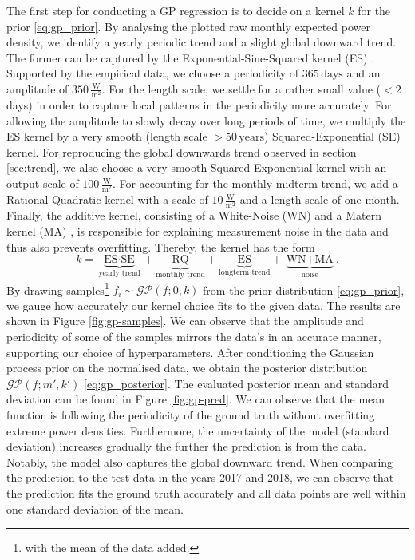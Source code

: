 \documentclass{article}
\theoremstyle{plain}
\theoremstyle{definition}
\theoremstyle{remark}
\begin{document}
The first step for conducting a GP regression is to decide on a kernel $k$ for the prior
\eqref{eq:gp_prior}. By analysing the plotted raw monthly expected power density, we identify a
yearly periodic trend and a slight global downward trend. The former can be captured by the
Exponential-Sine-Squared kernel (ES) \cite{MacKay1998IntroductionTG}. Supported by the empirical
data, we choose a periodicity of $365 \, \text{days}$ and an amplitude of $350 \,
\frac{\textrm{W}}{\text{m}^2}$. For the length scale, we settle for a rather small value ($< 2 \, $
days) in order to capture local patterns in the periodicity more accurately. For allowing the
amplitude to slowly decay over long periods of time, we multiply the ES kernel by a very smooth
(length scale $> 50 \, \text{years}$) Squared-Exponential (SE) kernel. For reproducing the global
downwards trend observed in section \ref{sec:trend}, we also choose a very smooth
Squared-Exponential kernel with an output scale of $100 \, \frac{\textrm{W}}{\text{m}^2}$. For
accounting for the monthly midterm trend, we add a Rational-Quadratic kernel
\cite{rasmussen-williams-gp} with a scale of $10 \, \frac{\textrm{W}}{\text{m}^2}$ and a length
scale of one month. Finally, the additive kernel, consisting of a White-Noise (WN) and a Matern
kernel (MA) \cite{abramowitz1968handbook}, is responsible for explaining measurement noise in the
data and thus also prevents overfitting. Thereby, the kernel has the form 
$$k = \underbrace{\text{ES} \cdot \text{SE}}_{\text{yearly trend}} 
+ \underbrace{\text{RQ}}_\text{monthly trend} 
+ \underbrace{\text{ES}}_\text{longterm trend} 
+ \underbrace{\text{WN} 
+ \text{MA}}_{\text{noise}}.$$
By drawing samples\footnote{with the mean of the data added.} $f_i \sim
\mathcal{GP}(f; 0, k)$ from the prior distribution \eqref{eq:gp_prior}, we gauge how accurately our
kernel choice fits to the given data. The results are shown in Figure \ref{fig:gp-samples}. We can
observe that the amplitude and periodicity of some of the samples mirrors the data's in an accurate
manner, supporting our choice of hyperparameters. After conditioning the Gaussian process prior on
the normalised data, we obtain the posterior distribution $\mathcal{GP}(f; m', k')$
\eqref{eq:gp_posterior}. The evaluated posterior mean and standard deviation can be found in Figure
\ref{fig:gp-pred}. We can observe that the mean function is following the periodicity of the ground
truth without overfitting extreme power densities. Furthermore, the uncertainty of the model
(standard deviation) increases gradually the further the prediction is from the data. Notably, the
model also captures the global downward trend. When comparing the prediction to the test data in the
years 2017 and 2018, we can observe that the prediction fits the ground truth accurately and all
data points are well within one standard deviation of the mean.
\end{document}
